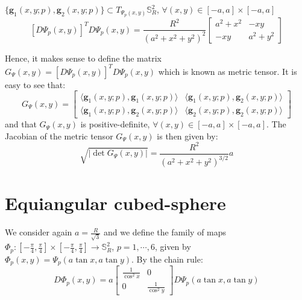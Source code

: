 $\{\boldsymbol{g}_{1}(x,y;p),\boldsymbol{g}_{2}(x,y;p)\} \subset T_{\Psi_p(x,y)}
\mathbb{S}_{R}^2$, $\forall (x,y) \in [-a,a]\times[-a,a]$
\begin{equation}
	\label{chp3-eqdistant-psitensor}
	[D\Psi_{p}(x,y)]^TD\Psi_{p}(x,y)
	= \frac{R^2}{(a^2 + x^2 + y^2)^2}
	\begin{bmatrix}
		 a^2 + x^2 &  -xy \\
		 -xy & a^2 + y^2
	\end{bmatrix}
\end{equation}

Hence, it makes sense to define the matrix 
$G_{\Psi}(x,y) = [D\Psi_{p}(x,y)]^TD\Psi_{p}(x,y)$ 
which is known as metric tensor.
It is easy to see that:
\begin{equation}
	\label{chp3-eqdistant-psi-metric-tensor}
	G_{\Psi}(x,y) = 
	\begin{bmatrix}
		\langle \boldsymbol{g}_{1}(x,y;p), \boldsymbol{g}_{1}(x,y;p) \rangle & 
		\langle \boldsymbol{g}_{1}(x,y;p), \boldsymbol{g}_{2}(x,y;p) \rangle \\
		\langle \boldsymbol{g}_{1}(x,y;p), \boldsymbol{g}_{2}(x,y;p) \rangle  &
		\langle \boldsymbol{g}_{2}(x,y;p), \boldsymbol{g}_{2}(x,y;p) \rangle 
	\end{bmatrix}
\end{equation}
and that $G_{\Psi}(x,y)$ is positive-definite, 
$\forall (x,y) \in [-a,a]\times[-a,a]$.
The Jacobian of the metric tensor $G_{\Psi}(x,y)$ is then given by:
\begin{equation}
	\sqrt{|\det{G_{\Psi}(x,y)}|} = \frac{R^2}{(a^2+x^2+y^2)^{3/2}}a 
\end{equation}

\section{Equiangular cubed-sphere}
\label{equiangular-cs}
We consider again $a=\frac{R}{\sqrt{3}}$
and we define the family of maps
$\Phi_{p}: [-\frac{\pi}{4},\frac{\pi}{4}] 
\times [-\frac{\pi}{4},\frac{\pi}{4}] 
\to \mathbb{S}^2_R$, $p=1, \cdots, 6$,
given by $\Phi_{p}(x,y) = \Psi_{p}(a\tan{x}, a\tan{y})$.
By the chain rule:
\begin{equation}
	D\Phi_{p}(x,y) = a
	\begin{bmatrix}
		\frac{1}{\cos^2 x} & 0 \\ 
		0 & \frac{1}{\cos^2 y} 
	\end{bmatrix}
	D\Psi_{p}(a\tan{x}, a\tan{y})
\end{equation}

